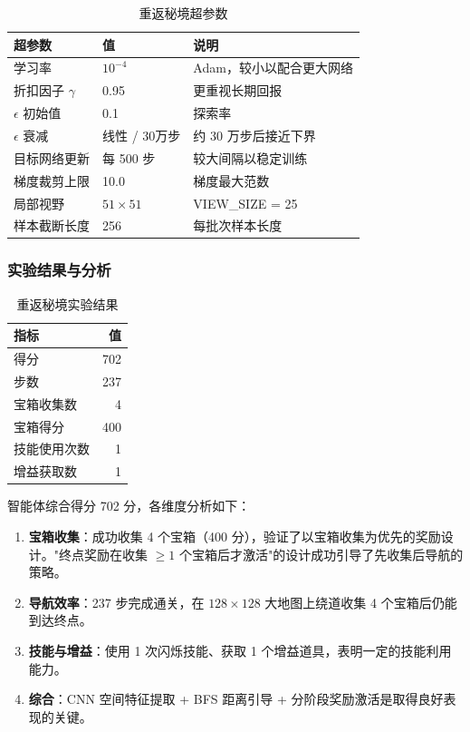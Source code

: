 \documentclass[12pt,a4paper]{article}
\begin{document}
\begin{table}[htbp]
\centering
\caption{重返秘境超参数}\label{tab:hw2_hyper}
\begin{tabular}{llp{6cm}}
\toprule
\textbf{超参数} & \textbf{值} & \textbf{说明} \\
\midrule
学习率              & $10^{-4}$    & Adam，较小以配合更大网络 \\
折扣因子 $\gamma$     & 0.95       & 更重视长期回报 \\
$\epsilon$ 初始值    & 0.1        & 探索率 \\
$\epsilon$ 衰减     & 线性 / 30万步  & 约 30 万步后接近下界 \\
目标网络更新         & 每 500 步    & 较大间隔以稳定训练 \\
梯度裁剪上限         & 10.0       & 梯度最大范数 \\
局部视野             & $51\times51$ & VIEW\_SIZE = 25 \\
样本截断长度         & 256        & 每批次样本长度 \\
\bottomrule
\end{tabular}
\end{table}

\subsubsection{实验结果与分析}

\begin{table}[htbp]
\centering
\caption{重返秘境实验结果}\label{tab:hw2_result}
\begin{tabular}{lr}
\toprule
\textbf{指标} & \textbf{值} \\
\midrule
得分           & 702 \\
步数           & 237 \\
宝箱收集数     & 4 \\
宝箱得分       & 400 \\
技能使用次数   & 1 \\
增益获取数     & 1 \\
\bottomrule
\end{tabular}
\end{table}

智能体综合得分 702 分，各维度分析如下：

\begin{enumerate}[nosep]
\item \textbf{宝箱收集}：成功收集 4 个宝箱（400 分），验证了以宝箱收集为优先的奖励设计。"终点奖励在收集 $\geq1$ 个宝箱后才激活"的设计成功引导了先收集后导航的策略。
\item \textbf{导航效率}：237 步完成通关，在 $128\times128$ 大地图上绕道收集 4 个宝箱后仍能到达终点。
\item \textbf{技能与增益}：使用 1 次闪烁技能、获取 1 个增益道具，表明一定的技能利用能力。
\item \textbf{综合}：CNN 空间特征提取 + BFS 距离引导 + 分阶段奖励激活是取得良好表现的关键。
\end{enumerate}
\end{document}
